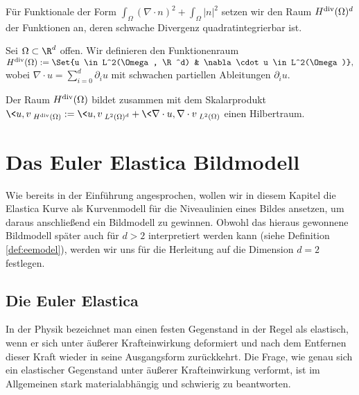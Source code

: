 \documentclass{mythesis}
\begin{document}
Für Funktionale der Form $\int_\Omega (\nabla \cdot n)^2 + \int_\Omega |n|^2$ setzen wir den Raum $H^{\mathrm{div}}(\Omega)^d$ der Funktionen an, deren schwache Divergenz quadratintegrierbar ist.

\begin{definition} \label{def:hdiv}
    Sei $\Omega \subset \R^d$ offen.
    Wir definieren den Funktionenraum
    \begin{math}
	\Hdiv(\Omega) := \Set{u \in L^2(\Omega, \R^d) & \nabla \cdot u \in L^2(\Omega)},
    \end{math}
    wobei $\nabla \cdot u = \sum_{i=0}^d \partial_i u$ mit schwachen partiellen Ableitungen $\partial_i u$.
\end{definition}

\begin{proposition} \label{lem:hdivhilbert}
    Der Raum $H^{\mathrm{div}}(\Omega)$ bildet zusammen mit dem Skalarprodukt
    \begin{math}
	\<u, v\>_{\Hdiv(\Omega)} := \<u, v\>_{L^2(\Omega)^d} + \<\nabla \cdot u, \nabla \cdot v\>_{L^2(\Omega)}
    \end{math}
    einen Hilbertraum.
\end{proposition}








\chapter{Das Euler Elastica Bildmodell} \label{chap:image_model}


Wie bereits in der Einführung angesprochen, wollen wir in diesem Kapitel die Elastica Kurve als Kurvenmodell für die Niveaulinien eines Bildes ansetzen, um daraus anschließend ein Bildmodell zu gewinnen.
Obwohl das hieraus gewonnene Bildmodell später auch für $d > 2$ interpretiert werden kann (siehe Definition \ref{def:eemodel}), werden wir uns für die Herleitung auf die Dimension $d = 2$ festlegen.

\section{Die Euler Elastica}

In der Physik bezeichnet man einen festen Gegenstand in der Regel als elastisch, wenn er sich unter äußerer Krafteinwirkung deformiert und nach dem Entfernen dieser Kraft wieder in seine Ausgangsform zurückkehrt.
Die Frage, wie genau sich ein elastischer Gegenstand unter äußerer Krafteinwirkung verformt, ist im Allgemeinen stark materialabhängig und schwierig zu beantworten.
\end{document}
